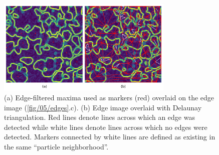 \begin{figure}[ht]
    \centering
    \includegraphics[width=0.75\textwidth]{figures/05/07-delaunay.png}
    \caption{
        \small{}
        (a) Edge-filtered maxima used as markers (red) overlaid on the
        edge image (\ref{fig/05/edges}.c).
        (b) Edge image overlaid with Delaunay
        triangulation. Red lines denote lines across which an edge was detected
        while white lines denote lines across which no edges were detected.
        Markers connected by white lines are defined as existing in the same
        ``particle neighborhood''.
    }
    \label{fig/05/delaunay}
\end{figure}


